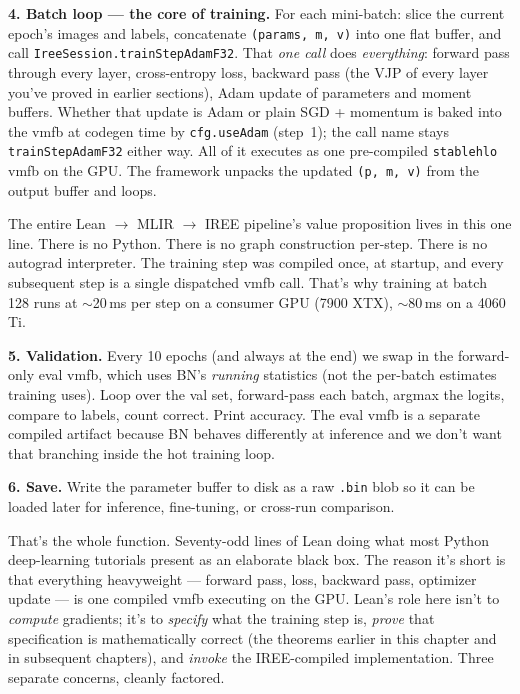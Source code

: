 \textbf{4. Batch loop --- the core of training.} For each mini-batch:
slice the current epoch's images and labels, concatenate
\texttt{(params, m, v)} into one flat buffer, and call
\texttt{IreeSession.trainStepAdamF32}. That \emph{one call} does
\emph{everything}: forward pass through every layer, cross-entropy
loss, backward pass (the VJP of every layer you've proved in
earlier sections), Adam update of parameters and moment buffers.
Whether that update is Adam or plain SGD + momentum is baked into
the vmfb at codegen time by \texttt{cfg.useAdam} (step~1); the call
name stays \texttt{trainStepAdamF32} either way.
All of it executes as one pre-compiled \texttt{stablehlo} vmfb on
the GPU. The framework unpacks the updated \texttt{(p, m, v)} from
the output buffer and loops.

The entire Lean $\to$ MLIR $\to$ IREE pipeline's value proposition
lives in this one line. There is no Python. There is no graph
construction per-step. There is no autograd interpreter. The
training step was compiled once, at startup, and every subsequent
step is a single dispatched vmfb call. That's why training at
batch 128 runs at $\sim$20\,ms per step on a consumer GPU
(7900 XTX), $\sim$80\,ms on a 4060 Ti.

\textbf{5. Validation.} Every 10 epochs (and always at the end) we
swap in the forward-only eval vmfb, which uses BN's \emph{running}
statistics (not the per-batch estimates training uses). Loop over
the val set, forward-pass each batch, argmax the logits, compare
to labels, count correct. Print accuracy. The eval vmfb is a
separate compiled artifact because BN behaves differently at
inference and we don't want that branching inside the hot training
loop.

\textbf{6. Save.} Write the parameter buffer to disk as a raw
\texttt{.bin} blob so it can be loaded later for inference,
fine-tuning, or cross-run comparison.

That's the whole function. Seventy-odd lines of Lean doing what
most Python deep-learning tutorials present as an elaborate black
box. The reason it's short is that everything heavyweight —
forward pass, loss, backward pass, optimizer update — is one
compiled vmfb executing on the GPU. Lean's role here isn't to
\emph{compute} gradients; it's to \emph{specify} what the training
step is, \emph{prove} that specification is mathematically correct
(the theorems earlier in this chapter and in subsequent chapters),
and \emph{invoke} the IREE-compiled implementation. Three separate
concerns, cleanly factored.

